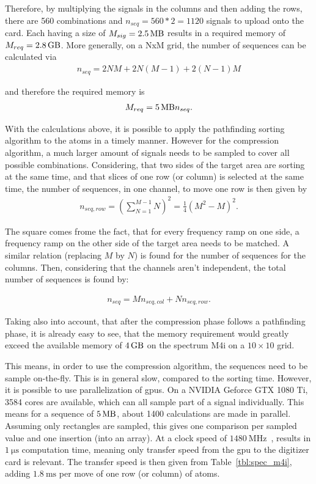 Therefore, by multiplying the signals in the columns and then adding the rows, there are 560 combinations and $n_{seq} = 560*2=1120$ signals to upload onto the card. Each having a size of $M_{sig} = \SI{2.5}{\mega\byte}$ results in a required memory of $M_{req}=\SI{2.8}{\giga\byte}$. More generally, on a NxM grid, the number of sequences can be calculated via
\begin{align}
	n_{seq} = 2 N M + 2 N (M-1) + 2 (N-1) M
\end{align}

and therefore the required memory is
\begin{align}
	M_{req} = \SI{5}{\mega\byte} n_{seq}.
\end{align}

With the calculations above, it is possible to apply the pathfinding sorting algorithm to the atoms in a timely manner. However for the compression algorithm, a much larger amount of signals needs to be sampled to cover all possible combinations. Considering, that two sides of the target area are sorting at the same time, and that slices of one row (or column) is selected at the same time, the number of sequences, in one channel, to move one row is then given by
\begin{align}
	n_{seq,row} = {\left(\sum_{N=1}^{M-1} N\right)}^2 = \frac{1}{4} {(M^2-M)}^2.
\end{align}

The square comes frome the fact, that for every frequency ramp on one side, a frequency ramp on the other side of the target area needs to be matched. A similar relation (replacing $M$ by $N$) is found for the number of sequences for the columns. Then, considering that the channels aren't independent, the total number of sequences is found by:

\begin{align}
	n_{seq} = M n_{seq,col} + N n_{seq,row}.
\end{align}

Taking also into account, that after the compression phase follows a pathfinding phase, it is already easy to see, that the memory requirement would greatly exceed the available memory of $\SI{4}{\giga\byte}$ on the spectrum M4i on a $10\times10$ grid.

This means, in order to use the compression algorithm, the sequences need to be sample on-the-fly. This is in general slow, compared to the sorting time. However, it is possible to use parallelization of \acp{gpu}. On a NVIDIA Geforce GTX 1080 Ti, 3584 cores are available, which can all sample part of a signal individually. This means for a sequence of $\SI{5}{\mega\byte}$, about 1400 calculations are made in parallel. Assuming only rectangles are sampled, this gives one comparison per sampled value and one insertion (into an array). At a clock speed of $\SI{1480}{\mega\hertz}$~\cite{NVIDIA}, results in $\SI{1}{\micro\second}$ computation time, meaning only transfer speed from the \ac{gpu} to the digitizer card is relevant. The transfer speed is then given from Table~\ref{tbl:spec_m4i}, adding $\SI{1.8}{\milli\second}$ per move of one row (or column) of atoms.

